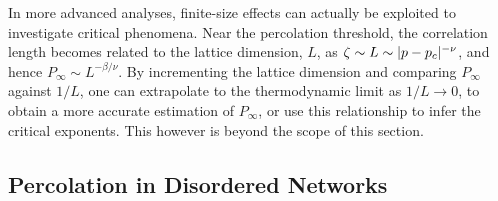 In more advanced analyses, finite\--size effects can actually be exploited to investigate critical phenomena. 
Near the percolation threshold, the correlation length becomes related to the lattice dimension, $L$, as $\zeta \sim L \sim \lvert p-p_c\rvert^{-\nu}$, and hence $P_\infty \sim L^{-
\beta/\nu}$. 
By incrementing the lattice dimension and comparing $P_\infty$ against $1/L$, one can extrapolate to the thermodynamic limit as $1/L \rightarrow 0$, to obtain a more accurate estimation of $P_\infty$, or use this relationship to infer the critical exponents. 
This however is beyond the scope of this section.

\subsection{Percolation in Disordered Networks}

